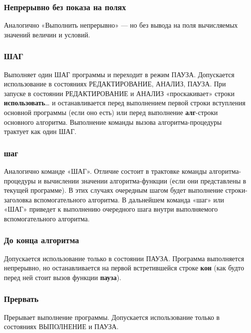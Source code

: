 \subsubsection{Непрерывно без показа на полях}

Аналогично «Выполнить непрерывно» --- но без вывода на поля вычисляемых значений величин и условий.

\subsubsection{ШАГ}

Выполняет один ШАГ программы и переходит в режим ПАУЗА. Допускается использование в состояниях РЕДАКТИРОВАНИЕ, АНАЛИЗ, ПАУЗА. При запуске в состоянии РЕДАКТИРОВАНИЕ и АНАЛИЗ «проскакивает» строки \textsf{\textbf{использовать}\dots} и останавливается перед выполнением первой строки вступления основной программы (если оно есть) или перед выполнение \textsf{\textbf{алг}}-строки основного алгоритма. Выполнение команды вызова алгоритма-процедуры трактует как один ШАГ.

\subsubsection{шаг}

Аналогично команде «ШАГ». Отличие состоит в трактовке команды алгоритма-процедуры и вычислении значении алгоритма-функции (если они представлены в текущей программе). В этих случаях очередным шагом будет выполнение строки-заголовка вспомогательного алгоритма. В дальнейшем команда «шаг» или «ШАГ» приведет к выполнению очередного шага внутри выполняемого вспомогательного алгоритма.

\subsubsection{До конца алгоритма}

Допускается использование только в состоянии ПАУЗА. Программа выполняется непрерывно, но останавливается на первой встретившейся строке \textsf{\textbf{кон}} (как будто перед ней стоит вызов функции \textsf{\textbf{пауза}}).

\subsubsection{Прервать}

Прерывает выполнение программы. Допускается использование только в состояниях ВЫПОЛНЕНИЕ и ПАУЗА.

